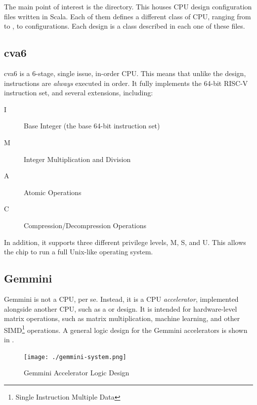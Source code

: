 The main point of interest is the  directory.
This houses CPU design configuration files written in Scala.
Each of them defines a different class of CPU, ranging from  to , to  configurations.
Each design is a class described in each one of these files.

\subsection{cva6}\label{sec:cva6_Generator}
\nocite{cva6Github}
\nocite{zaruba2019cost}
cva6 is a 6-stage, single issue, in-order CPU.\@
This means that unlike the  design, instructions are \emph{always} executed in order.
It fully implements the 64-bit RISC-V instruction set, and several extensions, including:
\begin{description}
\item[I] Base Integer (the base 64-bit instruction set)
\item[M] Integer Multiplication and Division
\item[A] Atomic Operations
\item[C] Compression/Decompression Operations
\end{description}
In addition, it supports three different privilege levels, M, S, and U.
This allows the chip to run a full Unix-like operating system.

\subsection{Gemmini}\label{sec:Gemmini_Generator}
\nocite{gemminiGithub}
\nocite{gemminiPaper}
Gemmini is not a CPU, per se.
Instead, it is a CPU \emph{accelerator}, implemented alongside another CPU, such as a  or  design.
It is intended for hardware-level matrix operations, such as matrix multiplication, machine learning, and other SIMD\footnote{Single Instruction Multiple Data} operations.
A general logic design for the Gemmini accelerators is shown in .

\begin{figure}[h!tbp]
  \centering
  \texttt{[image: ./gemmini-system.png]}
  \caption{Gemmini Accelerator Logic Design \parencite{gemminiGithub}}
  \label{fig:Gemmini_Accelerator}
\end{figure}

